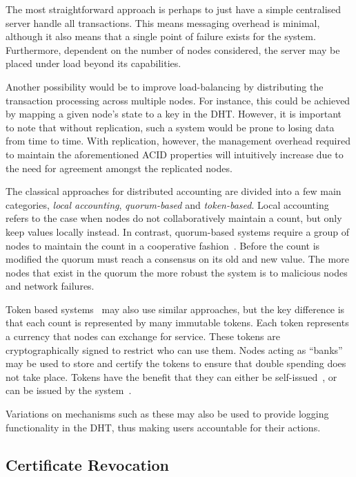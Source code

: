 \documentclass[pdftex,conference,10pt]{IEEEtran}
\begin{document}
The most straightforward approach is perhaps to just have a simple
centralised server handle all transactions. This means messaging
overhead is minimal, although it also means that a single point of
failure exists for the system. Furthermore, dependent on the number of
nodes considered, the server may be placed under load beyond its
capabilities.

Another possibility would be to improve load-balancing by distributing
the transaction processing across multiple nodes. For instance, this
could be achieved by mapping a given node's state to a key in the DHT.
However, it is important to note that without replication, such a
system would be prone to losing data from time to time. With
replication, however, the management overhead required to maintain the
aforementioned ACID properties will intuitively increase due to the
need for agreement amongst the replicated nodes.

The classical approaches for distributed accounting are divided into a
few main categories, \emph{local accounting}, \emph{quorum-based} and
\emph{token-based}. Local accounting refers to the case when nodes do
not collaboratively maintain a count, but only keep values locally
instead. In contrast, quorum-based systems require a group of nodes to
maintain the count in a cooperative fashion~\cite{Castro99Practical}.
Before the count is modified the quorum must reach a consensus on its
old and new value. The more nodes that exist in the quorum the more
robust the system is to malicious nodes and network failures.

Token based
systems~\cite{Liebau04Token}\cite{Thigpen02Distributed}\cite{Rivest96PayWord}
may also use similar approaches, but the key difference is that each
count is represented by many immutable tokens. Each token represents a
currency that nodes can exchange for service. These tokens are
cryptographically signed to restrict who can use them. Nodes acting as
``banks'' may be used to store and certify the tokens to ensure that
double spending does not take place. Tokens have the benefit that they
can either be self-issued~\cite{Thigpen02Distributed}, or can be issued
by the system~\cite{Rivest96PayWord}.

Variations on mechanisms such as these may also be used to provide
logging functionality in the DHT, thus making users accountable for
their actions.

\subsection{Certificate Revocation}
\label{subsect-revocation}
\end{document}
